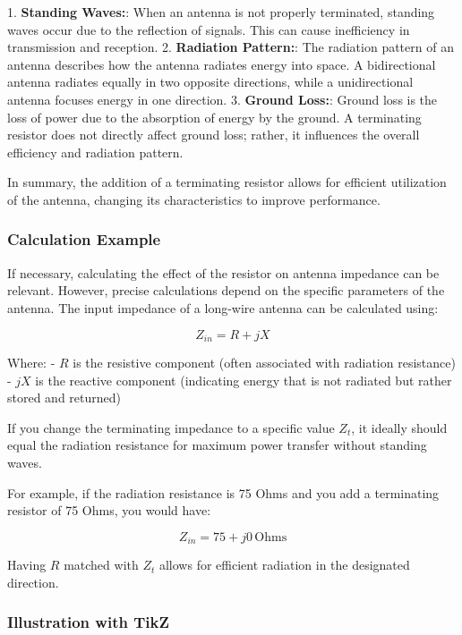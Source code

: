 1. \textbf{Standing Waves:}: When an antenna is not properly terminated, standing waves occur due to the reflection of signals. This can cause inefficiency in transmission and reception. 
2. \textbf{Radiation Pattern:}: The radiation pattern of an antenna describes how the antenna radiates energy into space. A bidirectional antenna radiates equally in two opposite directions, while a unidirectional antenna focuses energy in one direction.
3. \textbf{Ground Loss:}: Ground loss is the loss of power due to the absorption of energy by the ground. A terminating resistor does not directly affect ground loss; rather, it influences the overall efficiency and radiation pattern.

In summary, the addition of a terminating resistor allows for efficient utilization of the antenna, changing its characteristics to improve performance.

\subsubsection{Calculation Example}

If necessary, calculating the effect of the resistor on antenna impedance can be relevant. However, precise calculations depend on the specific parameters of the antenna. The input impedance of a long-wire antenna can be calculated using:

\[
Z_{in} = R + jX
\]

Where:
- \( R \) is the resistive component (often associated with radiation resistance)
- \( jX \) is the reactive component (indicating energy that is not radiated but rather stored and returned)

If you change the terminating impedance to a specific value \( Z_t \), it ideally should equal the radiation resistance for maximum power transfer without standing waves.

For example, if the radiation resistance is 75 Ohms and you add a terminating resistor of 75 Ohms, you would have:

\[
Z_{in} = 75 + j0 \, \text{Ohms}
\]

Having \( R \) matched with \( Z_t \) allows for efficient radiation in the designated direction.

\subsubsection{Illustration with TikZ}

\begin{center}
\end{center}
